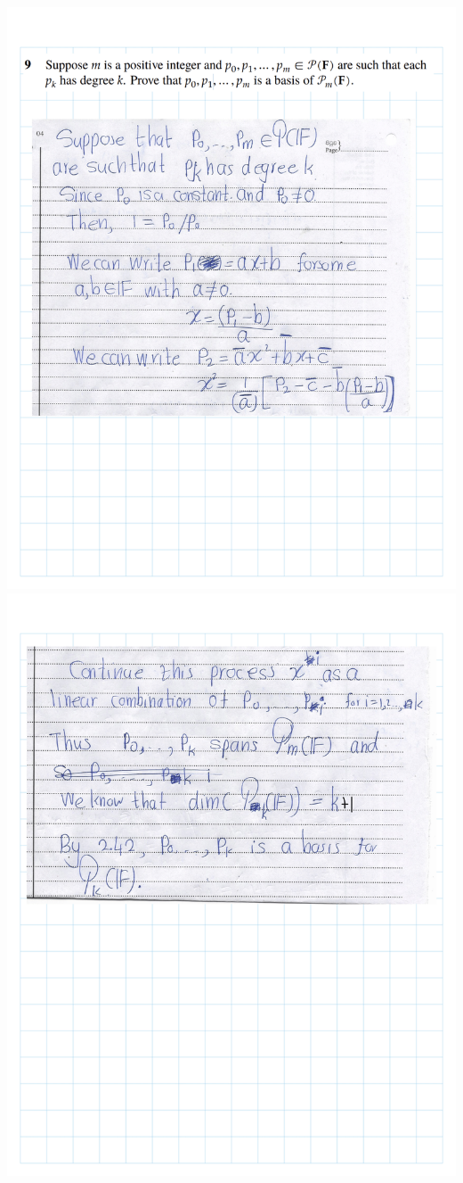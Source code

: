 \documentclass[
]{book}
\theoremstyle{definition}
\theoremstyle{definition}
\theoremstyle{definition}
\theoremstyle{definition}
\theoremstyle{remark}
\begin{document}
\includegraphics{fig/Ex 2B and 2C/Ex 2c (38).png}
\includegraphics{fig/Ex 2B and 2C/Ex 2c (39).png}
\end{document}

